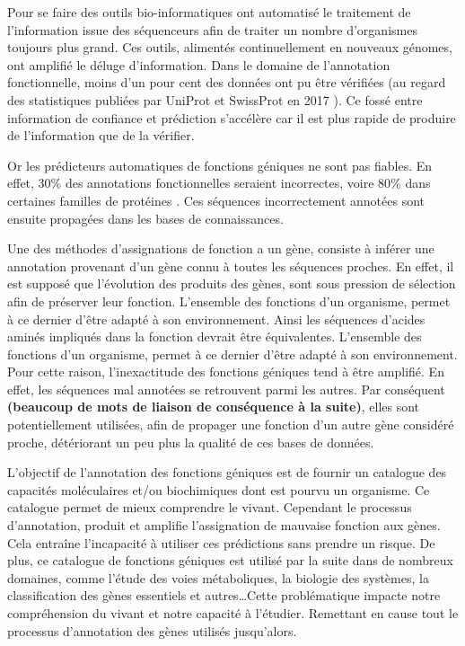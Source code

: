 \begin{refsegment}
Pour se faire des outils bio-informatiques ont automatisé le traitement de l'information issue des séquenceurs afin de traiter un nombre d'organismes toujours plus grand. Ces outils, alimentés continuellement en nouveaux génomes, ont amplifié le déluge d'information. Dans le domaine de l'annotation fonctionnelle, moins d'un pour cent des données ont pu être vérifiées (au regard des statistiques publiées par UniProt et SwissProt en 2017 \parencites{uniprot_stat}{expasy_stat} ). Ce fossé entre information de confiance et prédiction s'accélère car il est plus rapide de produire de l'information que de la vérifier.

Or les prédicteurs automatiques de fonctions géniques ne sont pas fiables. En effet, 30\% des annotations fonctionnelles seraient incorrectes, voire 80\% dans certaines familles de protéines \parencites{devos2001intrinsic}{schnoes2009annotation}. Ces séquences incorrectement annotées sont ensuite propagées dans les bases de connaissances.

Une des méthodes d'assignations de fonction a un gène, consiste à inférer une annotation provenant d'un gène connu à toutes les séquences proches. En effet, il est supposé que l'évolution des produits des gènes, sont sous pression de sélection afin de préserver leur fonction. L'ensemble des fonctions d'un organisme, permet à ce dernier d'être adapté à son environnement. Ainsi les séquences d'acides aminés impliqués dans la fonction devrait être équivalentes. L'ensemble des fonctions d'un organisme, permet à ce dernier d'être adapté à son environnement. Pour cette raison, l'inexactitude des fonctions géniques tend à être amplifié. En effet, les séquences mal annotées se retrouvent parmi les autres. Par conséquent \textbf{(beaucoup de mots de liaison de conséquence à la suite)}, elles sont potentiellement utilisées, afin de propager une fonction d'un autre gène considéré proche, détériorant un peu plus la qualité de ces bases de données.

L'objectif de l'annotation des fonctions géniques est de fournir un catalogue des capacités moléculaires et/ou biochimiques dont est pourvu un organisme. Ce catalogue permet de mieux comprendre le vivant. Cependant le processus d'annotation, produit et amplifie l'assignation de mauvaise fonction aux gènes. Cela entraîne l'incapacité à utiliser ces prédictions sans prendre un risque. De plus, ce catalogue de fonctions géniques est utilisé par la suite dans de nombreux domaines, comme l'étude des voies métaboliques, la biologie des systèmes, la classification des gènes essentiels et autres\ldots Cette problématique impacte notre compréhension du vivant et notre capacité à l'étudier. Remettant en cause tout le processus d'annotation des gènes utilisés jusqu'alors.


\end{refsegment}
